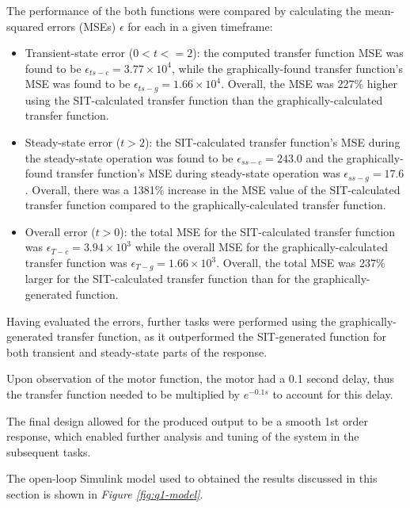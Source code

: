 \documentclass[11pt, onecolumn]{article}
\begin{document}
\par The performance of the both functions were compared by calculating the mean-squared errors (MSEs) $\epsilon$ for each in a given timeframe:
\begin{itemize}
    \item Transient-state error ($0 < t <= 2$): the computed transfer function MSE was found to be $\epsilon_{ts-c} = 3.77 \times 10^4$, while the graphically-found transfer function's MSE was found to be $\epsilon_{ts-g} = 1.66 \times 10^4$. Overall, the MSE was 227\% higher using the SIT-calculated transfer function than the graphically-calculated transfer function.
    \item Steady-state error ($t > 2$): the SIT-calculated transfer function's MSE during the steady-state operation was found to be $\epsilon_{ss-c} = 243.0$ and the graphically-found transfer function's MSE during steady-state operation was $\epsilon_{ss-g} = 17.6$. Overall, there was a 1381\% increase in the MSE value of the SIT-calculated transfer function compared to the graphically-calculated transfer function.
    \item Overall error ($t > 0$): the total MSE for the SIT-calculated transfer function was $\epsilon_{T-c}=3.94\times10^{3}$ while the overall MSE for the graphically-calculated transfer function was $\epsilon_{T-g}=1.66\times10^{3}$. Overall, the total MSE was 237\% larger for the SIT-calculated transfer function than for the graphically-generated function.
\end{itemize}
\par Having evaluated the errors, further tasks were performed using the graphically-generated transfer function, as it outperformed the SIT-generated function for both transient and steady-state parts of the response.
\par Upon observation of the motor function, the motor had a 0.1 second delay, thus the transfer function needed to be multiplied by $e^{-0.1s}$ to account for this delay.
\par The final design allowed for the produced output to be a smooth 1st order response, which enabled further analysis and tuning of the system in the subsequent tasks.
\par The open-loop Simulink model used to obtained the results discussed in this section is shown in \textit{Figure \ref{fig:q1-model}}.\\
\end{document}
